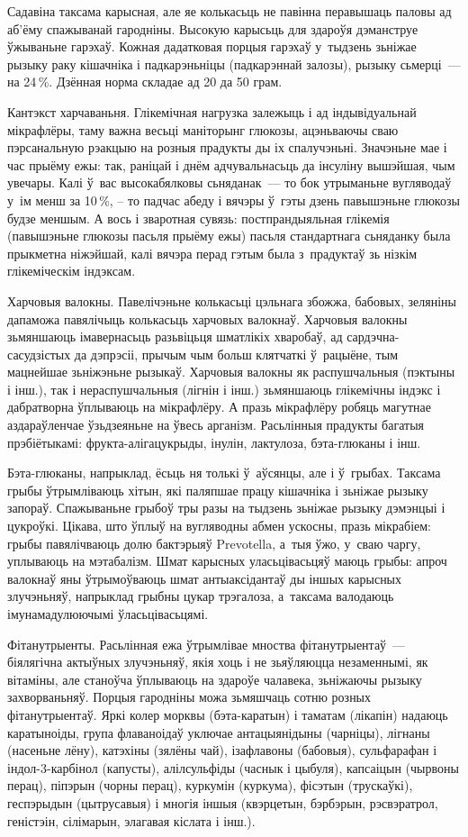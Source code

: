 Садавіна таксама карысная, але яе колькасьць не павінна перавышаць паловы ад аб'ёму спажыванай гародніны. Высокую карысьць для здароўя дэманструе ўжываньне гарэхаў. Кожная дадатковая порцыя гарэхаў у~тыдзень зьніжае рызыку раку кішачніка і падкарэньніцы (падкарэннай залозы), рызыку сьмерці~--- на 24\,\%. Дзённая норма складае ад 20 да 50 грам.

Кантэкст харчаваньня. Глікемічная нагрузка залежыць і ад індывідуальнай мікрафлёры, таму важна весьці маніторынг глюкозы, ацэньваючы сваю пэрсанальную рэакцыю на розныя прадукты ды іх спалучэньні. Значэньне мае і час прыёму ежы: так, раніцай і днём адчувальнасьць да інсуліну вышэйшая, чым увечары. Калі ў~вас высокабялковы сьняданак~--- то бок утрыманьне вугляводаў у~ім менш за 10\,\%, -- то падчас абеду і вячэры ў~гэты дзень павышэньне глюкозы будзе меншым. А вось і зваротная сувязь: постпрандыяльная глікемія (павышэньне глюкозы пасьля прыёму ежы) пасьля стандартнага сьняданку была прыкметна ніжэйшай, калі вячэра перад гэтым была з~прадуктаў зь нізкім глікеміческім індэксам.

Харчовыя валокны. Павелічэньне колькасьці цэльнага збожжа, бабовых, зеляніны дапаможа павялічыць колькасьць харчовых валокнаў. Харчовыя валокны зьмяншаюць імавернасьць разьвіцьця шматлікіх хваробаў, ад сардэчна-сасудзістых да дэпрэсіі, прычым чым больш клятчаткі ў~рацыёне, тым мацнейшае зьніжэньне рызыкаў. Харчовыя валокны як распушчальныя (пэктыны і інш.), так і нераспушчальныя (лігнін і інш.) зьмяншаюць глікемічны індэкс і дабратворна ўплываюць на мікрафлёру. А празь мікрафлёру робяць магутнае аздараўленчае ўзьдзеяньне на ўвесь арганізм. Расьлінныя прадукты багатыя прэбіётыкамі: фрукта-алігацукрыды, інулін, лактулоза, бэта-глюканы і інш.

Бэта-глюканы, напрыклад, ёсьць ня толькі ў~аўсянцы, але і ў~грыбах. Таксама грыбы ўтрымліваюць хітын, які паляпшае працу кішачніка і зьніжае рызыку запораў. Спажываньне грыбоў тры разы на тыдзень зьніжае рызыку дэмэнцыі і цукроўкі. Цікава, што ўплыў на вугляводны абмен ускосны, празь мікрабіем: грыбы павялічваюць долю бактэрыяў Prevotella, а~тыя ўжо, у~сваю чаргу, уплываюць на мэтабалізм. Шмат карысных уласьцівасьцяў маюць грыбы: апроч валокнаў яны ўтрымоўваюць шмат антыаксідантаў ды іншых карысных злучэньняў, напрыклад грыбны цукар трэгалоза, а~таксама валодаюць імунамадулюючымі ўласьцівасьцямі.

Фітанутрыенты. Расьлінная ежа ўтрымлівае мноства фітанутрыентаў~--- біялягічна актыўных злучэньняў, якія хоць і не зьяўляюцца незаменнымі, як вітаміны, але станоўча ўплываюць на здароўе чалавека, зьніжаючы рызыку захворваньняў. Порцыя гародніны можа зьмяшчаць сотню розных фітанутрыентаў. Яркі колер морквы (бэта-каратын) і таматам (лікапін) надаюць каратыноіды, група флаваноідаў уключае антацыянідыны (чарніцы), лігнаны (насеньне лёну), катэхіны (зялёны чай), ізафлавоны (бабовыя), сульфарафан і індол-3-карбінол (капусты), алілсульфіды (часнык і цыбуля), капсаіцын (чырвоны перац), піпэрын (чорны перац), куркумін (куркума), фісэтын (трускаўкі), геспэрыдын (цытрусавыя) і многія іншыя (квэрцетын, бэрбэрын, рэсвэратрол, геністэін, сілімарын, элагавая кіслата і інш.).

